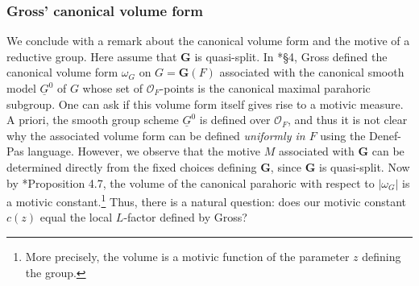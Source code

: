 \documentclass{amsart}
\newcommand{\ri}{\mathcal{O}}
\newcommand{\bG}{\mathbf{G}}
\newcommand{\can}{\mathrm{can}}
\theoremstyle{plain}
\theoremstyle{definition}
\begin{document}
\subsubsection{Gross' canonical volume form}
We conclude with a remark about the canonical volume form and the motive of a reductive group. 
Here assume that $\bG$ is quasi-split. In  \cite{gross:97a}*{\S 4}, Gross defined the canonical volume form
$\omega_G$ on $G=\bG(F)$ associated with the canonical smooth model 
$\underline{G}^0$ of $G$ whose set of $\ri_F$-points is the canonical maximal parahoric subgroup. 
One can ask if this volume form itself gives rise to a motivic measure. 
A priori, the smooth group scheme $\underline{G}^0$ is defined over $\ri_F$, and thus it is not clear why the
associated volume form can be defined \emph{uniformly in $F$} using the Denef-Pas language.
However, we observe that the motive $M$ associated with $\bG$ can be determined directly from the fixed choices defining $\bG$,
since $\bG$ is quasi-split.
Now by \cite{gross:97a}*{Proposition 4.7}, the volume of the canonical parahoric with respect to $|\omega_G|$
is a motivic constant.\footnote{More precisely, the volume is a motivic function of the parameter $z$ defining the group.}  
Thus, there is a natural question: does our motivic constant $c(z)$ equal the local $L$-factor defined by Gross? 




\end{document}
